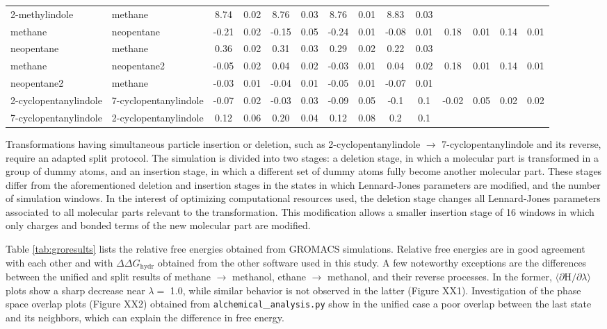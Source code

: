 \documentclass[journal=jctcce,manuscript=article]{achemso}
\begin{document}
\begin{sidewaystable}[]
{\begin{tabular}{llcccccccccccc}
2-methylindole & methane & 8.74 & 0.02 & 8.76 & 0.03 & 8.76 & 0.01 & 8.83 & 0.03 &  &  &  &  \\
methane & neopentane & -0.21 & 0.02 & -0.15 & 0.05 & -0.24 & 0.01 & -0.08 & 0.01 & 0.18 & 0.01 & 0.14 & 0.01 \\
neopentane & methane & 0.36 & 0.02 & 0.31 & 0.03 & 0.29 & 0.02 & 0.22 & 0.03 &  &  &  &  \\
methane & neopentane2 & -0.05 & 0.02 & 0.04 & 0.02 & -0.03 & 0.01 & 0.04 & 0.02 & 0.18 & 0.01 & 0.14 & 0.01 \\
neopentane2 & methane & -0.03 & 0.01 & -0.04 & 0.01 & -0.05 & 0.01 & -0.07 & 0.01 &  &  &  &  \\
2-cyclopentanylindole & 7-cyclopentanylindole & -0.07 & 0.02 & -0.03 & 0.03 & -0.09 & 0.05 & -0.1 & 0.1 & -0.02 & 0.05 & 0.02 & 0.02 \\
7-cyclopentanylindole & 2-cyclopentanylindole & 0.12 & 0.06 & 0.20 & 0.04 & 0.12 & 0.08 & 0.2 & 0.1 &  &  &  &  \\ \bottomrule
\end{tabular}
}
\end{sidewaystable}

Transformations having simultaneous particle insertion or deletion, such as 
2-cyclopentanylindole $\rightarrow$ 7-cyclopentanylindole and its reverse, require 
an adapted split protocol. The simulation is divided into two stages: a deletion stage, 
in which a molecular part is transformed in a group of dummy atoms, and 
an insertion stage, in which a different set of dummy atoms fully become another 
molecular part. These stages differ from the aforementioned deletion and insertion stages
in the states in which Lennard-Jones parameters are modified, and the number 
of simulation windows. In the interest of optimizing computational resources used, the deletion 
stage changes all Lennard-Jones parameters associated to all molecular parts relevant 
to the transformation. This modification allows a smaller insertion stage of 16 windows 
in which only charges and bonded terms of the new molecular part are modified.


Table \ref{tab:groresults} lists the relative free energies obtained from GROMACS simulations.
Relative free energies are in good agreement with each other and with 
$\Delta \Delta G_{\mathrm{hydr}}$ obtained from the other software used in this study. 
A few noteworthy exceptions are the differences between the unified and split results of 
methane $\rightarrow$ methanol, ethane $\rightarrow$ methanol, and their reverse processes.
In the former, $\langle \partial \mathrm{H}/\partial \lambda \rangle$ plots show a sharp decrease 
near $\lambda = $ 1.0, while similar behavior is not observed in the latter (Figure XX1). 
Investigation of the phase space overlap plots (Figure XX2) obtained from \texttt{alchemical}\_\texttt{analysis.py} 
show in the unified case a poor overlap between the last state and its neighbors, 
which can explain the difference in free energy. 
\end{document}
